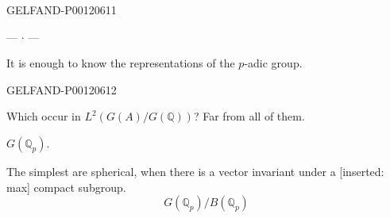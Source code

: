 \begin{GelfandAdjacentEvidence}{GELFAND-P001206}{11}

\begin{center}--- \(\cdot\) ---\end{center}
It is enough to know the representations of the $p$-adic group.
\end{GelfandAdjacentEvidence}
\begin{GelfandAdjacentEvidence}{GELFAND-P001206}{12}


Which occur in \(L^2(G(A)/G(\mathbb Q))\)? Far from all of them.

 \(G(\mathbb Q_p)\).

The simplest are spherical, when there is a vector invariant under a [inserted: max] compact subgroup.
\[
G(\mathbb Q_p)/B(\mathbb Q_p)
\]
\end{GelfandAdjacentEvidence}



